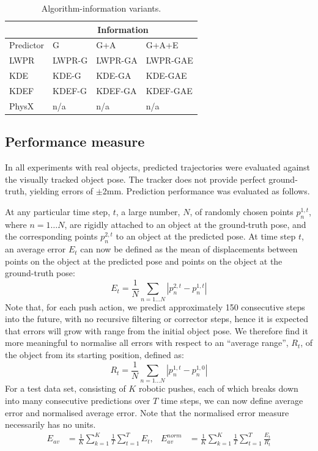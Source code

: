 \begin{table}[b]
\begin{center}
\begin{tabular}{|l|l|l|l|}\hline
 & \multicolumn{3}{|c|}{Information} \\ \hline
Predictor & G & G+A & G+A+E \\ \hline
LWPR & LWPR-G& LWPR-GA & LWPR-GAE \\ \hline
KDE & KDE-G & KDE-GA & KDE-GAE \\ \hline
KDEF & KDEF-G & KDEF-GA & KDEF-GAE \\ \hline
PhysX & n/a & n/a & n/a \\ \hline
\end{tabular}
\caption{Algorithm-information variants. \label{tab:algs}}
\end{center}
\end{table}
\subsection{Performance measure}\label{sec:Experiment.Performance}

In all experiments with real objects, predicted trajectories were evaluated against the visually tracked object pose. The tracker does not provide perfect ground-truth, yielding errors of $\pm$2mm. Prediction performance was evaluated as follows.

At any particular time step, $t$, a large number, $N$, of randomly chosen points $p_{n}^{1,t}$, where $n=1 \ldots N$, are rigidly attached to an object at the ground-truth pose, and the corresponding points $p_{n}^{2,t}$ to an object at the predicted pose. At time step $t$, an average error $E_t$ can now be defined as the mean of displacements between points on the object at the predicted pose and points on the object at the ground-truth pose:
\begin{equation}
E_t = \frac{1}{N} \mathop{\sum}_{n=1 \ldots N}|p_{n}^{2,t}-p_{n}^{1,t}|
\label{eq:defn_Rt}
\end{equation}
Note that, for each push action, we predict approximately 150
consecutive steps into the future, with no recursive filtering or
corrector steps, hence it is expected that errors will grow with range
from the initial object pose. We therefore find it more meaningful to
normalise all errors with respect to an ``average range'', $R_t$, of
the object from its starting position, defined as:
\begin{equation}
R_t = \frac{1}{N} \mathop{\sum}_{n=1 \ldots N}|p_{n}^{1,t}-p_{n}^{1,0}|
\label{eq:defn_Et}
\end{equation}
For a test data set, consisting of $K$ robotic pushes, each of which breaks down into many consecutive predictions over $T$ time steps, we can now define average error and normalised average error. Note that the normalised error measure necessarily has no units.
\begin{align}
E_{av} &= \frac{1}{K} \mathop{\sum}_{k=1}^{K} \frac{1}{T} \mathop{\sum}_{t=1}^{T} E_t,
&E_{av}^{norm} &= \frac{1}{K} \mathop{\sum}_{k=1}^{K} \frac{1}{T} \mathop{\sum}_{t=1}^{T} \frac{E_t}{R_t}
\label{eq:Error1}
\end{align}


